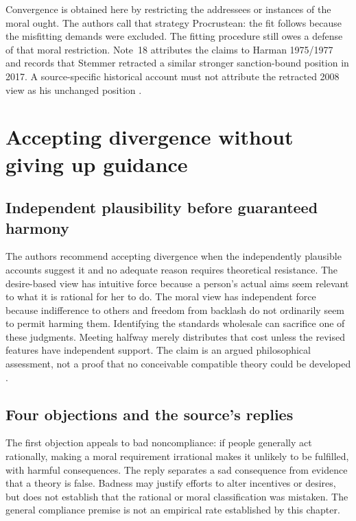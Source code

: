 Convergence is obtained here by restricting the addressees or
instances of the moral ought. The authors call that strategy
Procrustean: the fit follows because the misfitting demands were
excluded. The fitting procedure still owes a defense of that moral
restriction. Note~18 attributes the claims to Harman 1975/1977
and records that Stemmer retracted a similar stronger sanction-bound
position in 2017. A source-specific historical account must not
attribute the retracted 2008 view as his unchanged position
\parencite[p.~687 and n.~18]{FehigeWessels2021Morality}.

\section{Accepting divergence without giving up guidance}
\label{sec:p11-rat121-divergence}

\subsection{Independent plausibility before guaranteed harmony}

The authors recommend accepting divergence when the independently
plausible accounts suggest it and no adequate reason requires
theoretical resistance. The desire-based view has intuitive force
because a person's actual aims seem relevant to what it is rational
for her to do. The moral view has independent force because
indifference to others and freedom from backlash do not ordinarily
seem to permit harming them. Identifying the standards wholesale
can sacrifice one of these judgments. Meeting halfway merely
distributes that cost unless the revised features have independent
support. The claim is an argued philosophical assessment, not a
proof that no conceivable compatible theory could be developed
\parencite[pp.~687--688]{FehigeWessels2021Morality}.

\subsection{Four objections and the source's replies}

The first objection appeals to bad noncompliance: if people generally
act rationally, making a moral requirement irrational makes it
unlikely to be fulfilled, with harmful consequences. The reply
separates a sad consequence from evidence that a theory is false.
Badness may justify efforts to alter incentives or desires, but
does not establish that the rational or moral classification was
mistaken. The general compliance premise is not an empirical
rate established by this chapter.

